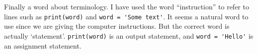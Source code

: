 





Finally a word about terminology.  I have used the word ``instruction''
to refer to lines such as \verb!print(word)! and \verb!word = 'Some text'!.
It seems a natural word to use since we are giving the computer instructions.
But the correct word is actually `statement'.  \verb!print(word)! is
an output statement, and \verb!word = 'Hello'! is an assignment statement.

